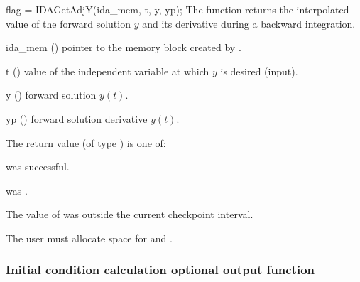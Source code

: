 {
  flag = IDAGetAdjY(ida\_mem, t, y, yp);
}
{
  The function  returns the interpolated value of the
 forward solution $y$ and its derivative during a backward integration.
}
{
  \begin{args}
  \item[ida\_mem] ()
    pointer to the {\idas} memory block created by .
  \item[t] ()
    value of the independent variable at which $y$ is desired (input).
  \item[y] () forward solution $y(t)$.
  \item[yp] () forward solution derivative $\dot{y}(t)$.
  \end{args}
}
{
  The return value  (of type ) is one of:
 \begin{args}
  \item[\Id{IDA\_SUCCESS}] 
     was successful. 
  \item[\Id{IDA\_MEM\_NULL}]
     was .
  \item[\Id{IDA\_GETY\_BADT}]
    The value of  was outside the current checkpoint interval.
  \end{args}
}
{
  {\warn} The user must allocate space for  and .
}

\subsubsection{Initial condition calculation optional output function}
\label{sss:optout_iccalcB}

